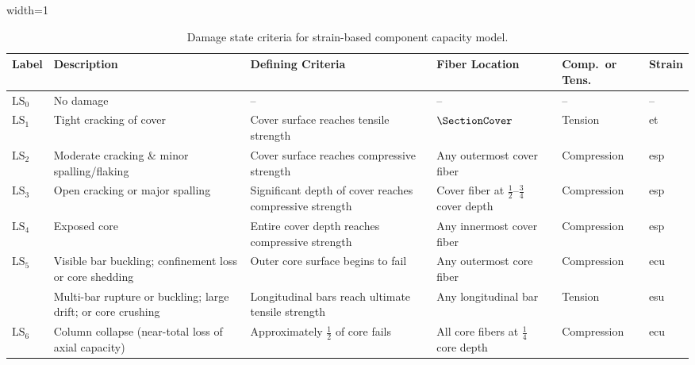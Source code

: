 \begin{table}[H]
\centering
\caption{Damage state criteria for strain-based component capacity model.}
\begin{adjustbox}{width=1\textwidth}
\renewcommand{\arraystretch}{1.5}
\begin{tabular}{>{\centering\arraybackslash}m{1.2cm}
                 m{4.2cm}
                 m{5.2cm}
                 m{3.4cm}
                 >{\centering\arraybackslash}m{2.4cm}
                 >{\centering\arraybackslash}m{1.4cm}}

\toprule
\textbf{Label} &
\textbf{Description} &
\textbf{Defining Criteria} &
\textbf{Fiber Location} &
\textbf{Comp.\ or Tens.} &
\textbf{Strain} \\
\midrule

$\mathrm{LS}_{0}$ & No damage & -- & -- & -- & -- \\
\rowcolor{lightgray}
$\mathrm{LS}_{1}$ & Tight cracking of cover &
  Cover surface reaches tensile strength &
  $\SectionCover$ & Tension & \gls{et} \\

$\mathrm{LS}_{2}$ & Moderate cracking \& minor spalling/flaking &
  Cover surface reaches compressive strength &
  Any outermost cover fiber & Compression & \gls{esp} \\
\rowcolor{lightgray}
$\mathrm{LS}_{3}$ & Open cracking or major spalling &
  Significant depth of cover reaches compressive strength &
  Cover fiber at $\tfrac{1}{2}$--$\tfrac{3}{4}$ cover depth & Compression & \gls{esp} \\

$\mathrm{LS}_{4}$ & Exposed core &
  Entire cover depth reaches compressive strength &
  Any innermost cover fiber & Compression & \gls{esp} \\
\rowcolor{lightgray}
$\mathrm{LS}_{5}$ & Visible bar buckling; confinement loss or core shedding &
  Outer core surface begins to fail &
  Any outermost core fiber & Compression & \gls{ecu} \\
\rowcolor{lightgray}
      & Multi-bar rupture or buckling; large drift; or core crushing &
  Longitudinal bars reach ultimate tensile strength &
  Any longitudinal bar & Tension & \gls{esu} \\

$\mathrm{LS}_{6}$ & Column collapse (near-total loss of axial capacity) &
  Approximately $\tfrac{1}{2}$ of core fails &
  All core fibers at $\tfrac{1}{4}$ core depth & Compression & \gls{ecu} \\

\bottomrule
\end{tabular}
\end{adjustbox}
\label{tab:DSv2}
\end{table}

